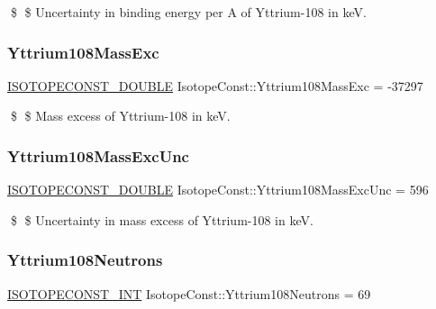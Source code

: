 \$ \$ Uncertainty in binding energy per A of Yttrium-\/108 in keV. \mbox{\label{group___isotope_const-_yttrium-_y108_gabe9dedcc06ad20597694b9e5f7a6f542}} 
\subsubsection{\texorpdfstring{Yttrium108\+Mass\+Exc}{Yttrium108MassExc}}
{\footnotesize\ttfamily \mbox{\hyperlink{group___isotope_const-_macros_ga8f45a7272ce02c0b4c65c44636ed719a}{I\+S\+O\+T\+O\+P\+E\+C\+O\+N\+S\+T\+\_\+\+D\+O\+U\+B\+LE}} Isotope\+Const\+::\+Yttrium108\+Mass\+Exc = -\/37297}

\$ \$ Mass excess of Yttrium-\/108 in keV. \mbox{\label{group___isotope_const-_yttrium-_y108_gab038fe712d55143debfd38ba758ddbd1}} 
\subsubsection{\texorpdfstring{Yttrium108\+Mass\+Exc\+Unc}{Yttrium108MassExcUnc}}
{\footnotesize\ttfamily \mbox{\hyperlink{group___isotope_const-_macros_ga8f45a7272ce02c0b4c65c44636ed719a}{I\+S\+O\+T\+O\+P\+E\+C\+O\+N\+S\+T\+\_\+\+D\+O\+U\+B\+LE}} Isotope\+Const\+::\+Yttrium108\+Mass\+Exc\+Unc = 596}

\$ \$ Uncertainty in mass excess of Yttrium-\/108 in keV. \mbox{\label{group___isotope_const-_yttrium-_y108_ga247d12a530e623097bc6339e7cd857ba}} 
\subsubsection{\texorpdfstring{Yttrium108\+Neutrons}{Yttrium108Neutrons}}
{\footnotesize\ttfamily \mbox{\hyperlink{group___isotope_const-_macros_ga5f18360b3e99483a35c32d789e62621c}{I\+S\+O\+T\+O\+P\+E\+C\+O\+N\+S\+T\+\_\+\+I\+NT}} Isotope\+Const\+::\+Yttrium108\+Neutrons = 69}

